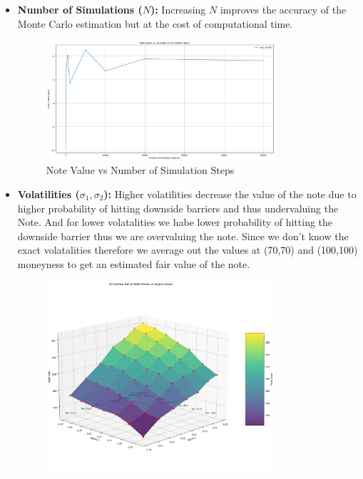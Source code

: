 \documentclass[12pt,a4paper]{article}
\begin{document}
\begin{itemize}
    \item \textbf{Number of Simulations (\( N \)):} Increasing \( N \) improves the accuracy of the Monte Carlo estimation but at the cost of computational time.
	\begin{figure}[H]
	    \centering
	    \includegraphics[width=0.8\textwidth, keepaspectratio]{images_project_3/note_val_sim.png}
	    \caption{Note Value vs Number of Simulation Steps}
	    \label{fig:yourlabel}
	\end{figure}
    \item \textbf{Volatilities (\( \sigma_1, \sigma_2 \)):} Higher volatilities decrease the value of the note due to higher probability of hitting downside barriers and thus undervaluing the Note. And for lower volatalities we habe lower probability of hitting the downside barrier thus we are overvaluing the note. Since we don't know the exact volatalities therefore we average out the values at (70,70) and (100,100) moneyness to get an estimated fair value of the note.
	\begin{figure}[H]
	    \centering
	     \includegraphics[width=0.8\textwidth, keepaspectratio]{images_project_3/note_val_sigma.png}

\end{figure}
\end{itemize}
\end{document}
